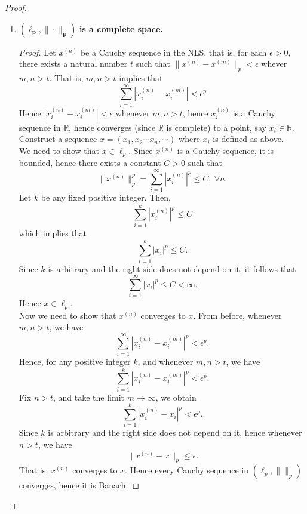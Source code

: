 \begin{eg}
\begin{proof}
\begin{enumerate}
            \item $\bm{(\ell_{p},\|\cdot\|_{p})}$\textbf{ is a complete space.}
                \begin{proof}
                    Let $x^{(n)}$ be a Cauchy sequence in the NLS, that is, for each $\epsilon>0$, there exists a natural number $t$ such that $\|x^{(n)}-x^{(m)}\|_{p}<\epsilon$ whever $m,n>t$. That is, $m,n>t$ implies that $$\sum_{i=1}^{\infty}|x_{i}^{(n)}-x_{i}^{(m)}|<\epsilon^{p}$$ 
                    Hence $\left|x_{i}^{(n)}-x_{i}^{(m)}\right|<\epsilon$ whenever $m,n>t$, hence $x_{i}^{(n)}$ is a Cauchy sequence in $\mathbb{R}$, hence converges (since $\mathbb{R}$ is complete) to a point, say $x_{i}\in \mathbb{R}$.\\ 
                    Construct a sequence $x=(x_{1},x_{2}\cdots x_{n},\cdots)$ where $x_{i}$ is defined as above.\\
                    We need to show that $x\in\ell_{p}$. Since $x^{(n)}$ is a Cauchy sequence, it is bounded, hence there exists a constant $C>0$ such that $$\|x^{(n)}\|_{p}^{p}=\sum_{i=1}^{\infty}\left|x_{i}^{(n)}\right|^{p}\leq C,~\forall n.$$
                    Let $k$ be any fixed positive integer. Then, $$\sum_{i=1}^{k}\left|x_{i}^{(n)}\right|^{p}\leq C$$ which implies that $$\sum_{i=1}^{k}\left|x_{i}\right|^{p}\leq C.$$
                    Since $k$ is arbitrary and the right side does not depend on it, it follows that $$\sum_{i=1}^{\infty}\left|x_{i}\right|^{p}\leq C<\infty.$$
                    Hence $x\in\ell_{p}$.\\ 
                    Now we need to show that $x^{(n)}$ converges to $x$. From before, whenever $m,n>t$, we have $$\sum_{i=1}^{\infty}|x_{i}^{(n)}-x_{i}^{(m)}|^{p}<\epsilon^{p}.$$
                    Hence, for any positive integer $k$, and whenever $m,n>t$, we have $$\sum_{i=1}^{k}|x_{i}^{(n)}-x_{i}^{(m)}|^{p}<\epsilon^{p}.$$
                    Fix $n>t$, and take the limit $m\to\infty$, we obtain $$\sum_{i=1}^{k}|x_{i}^{(n)}-x_{i}|^{p}<\epsilon^{p}.$$
                    Since $k$ is arbitrary and the right side does not depend on it, hence whenever $n>t$, we have $$\|x^{(n)}-x\|_{p}\leq \epsilon.$$
                    That is, $x^{(n)}$ converges to $x$.
                    Hence every Cauchy sequence in $(\ell_{p},\|\|_{p})$ converges, hence it is Banach.
                \end{proof}
        \end{enumerate}
        \phantom\qedhere
    \end{proof}
\end{eg}
